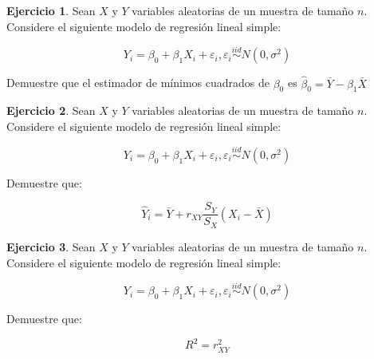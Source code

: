 \documentclass[
  11pt,
]{book}
\theoremstyle{definition}
\theoremstyle{definition}
\theoremstyle{definition}
\newtheorem{exercise}{Ejercicio}[chapter]
\theoremstyle{definition}
\theoremstyle{remark}
\begin{document}
\begin{exercise}
Sean \(X\) y \(Y\) variables aleatorias de un muestra de tamaño \(n\). Considere el siguiente modelo de regresión lineal simple:

\[
Y_i = \beta_0 + \beta_1X_i + \varepsilon_i, \varepsilon_i \overset{iid}{\sim} N(0, \sigma^2)
\]

Demuestre que el estimador de mínimos cuadrados de \(\beta_0\) es \(\widehat{\beta}_0 = \bar{Y} - \beta_1\bar{X}\)
\end{exercise}

\begin{exercise}
Sean \(X\) y \(Y\) variables aleatorias de un muestra de tamaño \(n\). Considere el siguiente modelo de regresión lineal simple:

\[
Y_i = \beta_0 + \beta_1X_i + \varepsilon_i, \varepsilon_i \overset{iid}{\sim} N(0, \sigma^2)
\]

Demuestre que:

\[
\widehat{Y}_i = \bar{Y} + r_{XY}\displaystyle\frac{S_Y}{S_X}(X_i-\bar{X})
\]
\end{exercise}

\begin{exercise}
Sean \(X\) y \(Y\) variables aleatorias de un muestra de tamaño \(n\). Considere el siguiente modelo de regresión lineal simple:

\[
Y_i = \beta_0 + \beta_1X_i + \varepsilon_i, \varepsilon_i \overset{iid}{\sim} N(0, \sigma^2)
\]

Demuestre que:

\[
R^2 = r_{XY}^2
\]
\end{exercise}
\end{document}

